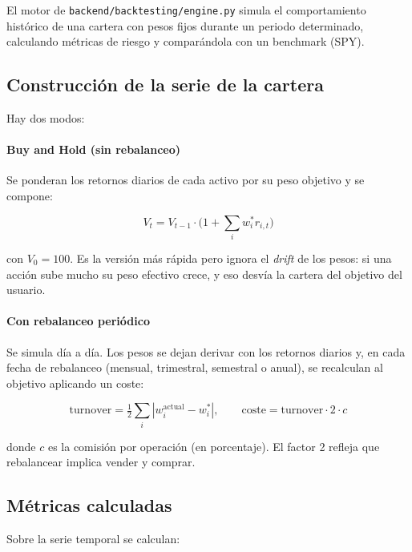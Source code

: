 \documentclass[11pt,a4paper]{article}
\begin{document}
El motor de \texttt{backend/backtesting/engine.py} simula el comportamiento histórico de una cartera con pesos fijos durante un periodo determinado, calculando métricas de riesgo y comparándola con un benchmark (SPY).

\subsection{Construcción de la serie de la cartera}

Hay dos modos:

\paragraph{Buy and Hold (sin rebalanceo)}
Se ponderan los retornos diarios de cada activo por su peso objetivo y se compone:

\begin{equation}
V_t = V_{t-1}\cdot\bigg(1 + \sum_i w_i^* r_{i,t}\bigg)
\end{equation}

con $V_0 = 100$. Es la versión más rápida pero ignora el \textit{drift} de los pesos: si una acción sube mucho su peso efectivo crece, y eso desvía la cartera del objetivo del usuario.

\paragraph{Con rebalanceo periódico}
Se simula día a día. Los pesos se dejan derivar con los retornos diarios y, en cada fecha de rebalanceo (mensual, trimestral, semestral o anual), se recalculan al objetivo aplicando un coste:

\begin{equation}
\mathrm{turnover} = \tfrac{1}{2}\sum_i |w_i^{\text{actual}} - w_i^*|,\qquad \mathrm{coste} = \mathrm{turnover}\cdot 2\cdot c
\end{equation}

donde $c$ es la comisión por operación (en porcentaje). El factor 2 refleja que rebalancear implica vender y comprar.

\subsection{Métricas calculadas}

Sobre la serie temporal se calculan:
\end{document}
